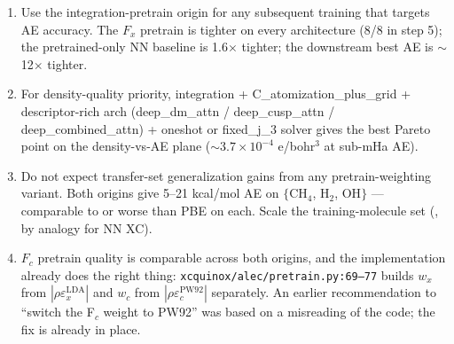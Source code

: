 \documentclass[11pt,letterpaper]{article}
\begin{document}
\begin{enumerate}
\item Use the integration-pretrain origin for any subsequent training that targets AE
  accuracy. The $F_x$ pretrain is tighter on every architecture (8/8 in step 5);
  the pretrained-only NN baseline is 1.6$\times$ tighter; the downstream best AE is
  $\sim$12$\times$ tighter.
\item For density-quality priority, integration + C\_atomization\_plus\_grid +
  descriptor-rich arch (deep\_dm\_attn / deep\_cusp\_attn / deep\_combined\_attn) +
  oneshot or fixed\_j\_3 solver gives the best Pareto point on the density-vs-AE
  plane ($\sim 3.7 \times 10^{-4}$ e/bohr$^3$ at sub-mHa AE).
\item Do not expect transfer-set generalization gains from any pretrain-weighting
  variant. Both origins give 5--21 kcal/mol AE on $\{$CH$_4$, H$_2$, OH$\}$ ---
  comparable to or worse than PBE on each. Scale the training-molecule set
  (\citet{BehlerParrinello2007}, by analogy for NN XC).
\item $F_c$ pretrain quality is comparable across both origins, and the implementation
  already does the right thing: \texttt{xcquinox/alec/pretrain.py:69--77} builds
  $w_x$ from $|\rho \varepsilon_x^{\text{LDA}}|$ and $w_c$ from
  $|\rho \varepsilon_c^{\text{PW92}}|$ \citep{PerdewWang1992} separately. An earlier
  recommendation to ``switch the F$_c$ weight to PW92'' was based on a misreading of
  the code; the fix is already in place.
\end{enumerate}



\end{document}
